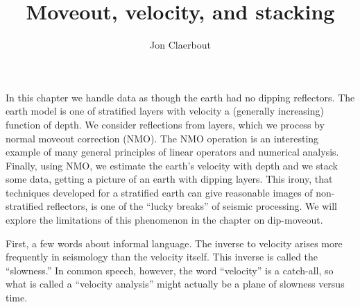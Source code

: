 \long{}
\def\CAKEDIR{.}
\def\RMS{{{\sc rms}}} 
\def\RMS{{\rm RMS}}

\title{Moveout, velocity, and stacking}
\author{Jon Claerbout}
\maketitle
\label{paper:vela}


In this chapter we handle data as though the earth had no dipping reflectors.
The earth model is one of stratified layers
with velocity a (generally increasing) function of depth.
We consider reflections from layers,
which we process by normal moveout correction (NMO).
The NMO operation is an interesting example
of many general principles of linear operators and numerical analysis.
Finally, using NMO, we estimate the earth's velocity with depth
and we stack some data,
getting a picture of an earth with dipping layers.
This irony, that techniques developed for a stratified earth
can give reasonable images of non-stratified reflectors,
is one of the ``lucky breaks'' of seismic processing.
We will explore the limitations of this phenomenon
in the chapter on dip-moveout.

\par
First, a few words about informal language.
The inverse to velocity arises more frequently
in seismology than the velocity itself.
This inverse is called the ``slowness.''
In common speech, however, the word ``velocity'' is a catch-all,
so what is called a ``velocity analysis''
might actually be a plane of slowness versus time.

